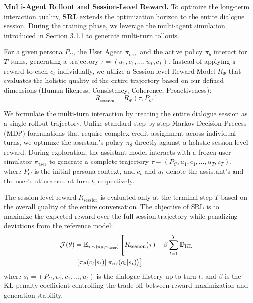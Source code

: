 \textbf{Multi-Agent Rollout and Session-Level Reward.}
To optimize the long-term interaction quality, \textbf{SRL} extends the optimization horizon to the entire dialogue session. During the training phase, we leverage the multi-agent simulation introduced in Section 3.1.1 to generate multi-turn rollouts. 

For a given persona $P_C$, the User Agent $\pi_{\text{user}}$ and the active policy $\pi_\theta$ interact for $T$ turns, generating a trajectory $\tau = (u_1, c_1, \dots, u_T, c_T)$. Instead of applying a reward to each $c_t$ individually, we utilize a Session-level Reward Model $R_{\Phi}$ that evaluates the holistic quality of the entire trajectory based on our defined dimensions (Human-likeness, Consistency, Coherence, Proactiveness):
\begin{equation}
    R_{\text{session}} = R_{\Phi}(\tau, P_C)
\end{equation}

We formulate the multi-turn interaction by treating the entire dialogue session as a single rollout trajectory. Unlike standard step-by-step Markov Decision Process (MDP) formulations that require complex credit assignment across individual turns, we optimize the assistant's policy $\pi_\theta$ directly against a holistic session-level reward. During exploration, the assistant model interacts with a frozen user simulator $\pi_{\text{user}}$ to generate a complete trajectory $\tau = (P_C, u_1, c_1, \dots, u_T, c_T)$, where $P_C$ is the initial persona context, and $c_t$ and $u_t$ denote the assistant's and the user's utterances at turn $t$, respectively. 

The session-level reward $R_{\text{session}}$ is evaluated only at the terminal step $T$ based on the overall quality of the entire conversation. The objective of \textsc{SRL} is to maximize the expected reward over the full session trajectory while penalizing deviations from the reference model:
\begin{align}
    \mathcal{J}(\theta) &= \mathbb{E}_{\tau \sim (\pi_\theta, \pi_{\text{user}})} \left[ R_{\text{session}}(\tau) - \beta \sum_{t=1}^T \mathbb{D}_{\text{KL}} \right. \notag \\
    &\left. \big( \pi_\theta(c_t|s_t) \| \pi_{\text{ref}}(c_t|s_t) \big) \right]
\end{align}
where $s_t = (P_C, u_1, c_1, \dots, u_t)$ is the dialogue history up to turn $t$, and $\beta$ is the KL penalty coefficient controlling the trade-off between reward maximization and generation stability. 

